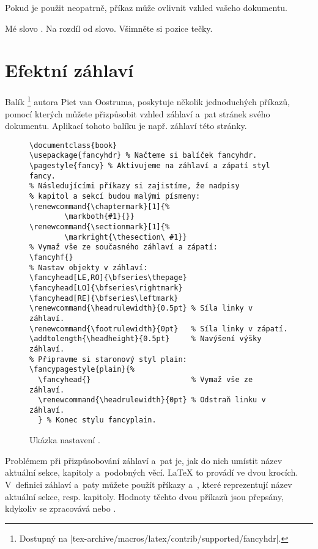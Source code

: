 Pokud je použit neopatrně, příkaz  může ovlivnit vzhled vašeho dokumentu.

\begin{example}
Mé slovo . Na rozdíl
od slovo. Všimněte
si pozice tečky.
\end{example}

\section{Efektní záhlaví}
\label{sec:fancy}

Balík \footnote{Dostupný na
  \CTANalt|tex-archive/macros/latex/contrib/supported/fancyhdr|.} autora
Piet van Oostruma, poskytuje několik jednoduchých příkazů, pomocí
kterých můžete přizpůsobit vzhled záhlaví a~pat stránek svého
dokumentu. Aplikací tohoto balíku je např. záhlaví této stránky.


\begin{figure}[!htbp]
\begin{lined}{\textwidth}
\begin{verbatim}
\documentclass{book}
\usepackage{fancyhdr} % Načteme si balíček fancyhdr.
\pagestyle{fancy} % Aktivujeme na záhlaví a zápatí styl fancy.
% Následujícími příkazy si zajistíme, že nadpisy  
% kapitol a sekcí budou malými písmeny:
\renewcommand{\chaptermark}[1]{%
        \markboth{#1}{}}
\renewcommand{\sectionmark}[1]{%
        \markright{\thesection\ #1}}
% Vymaž vše ze současného záhlaví a zápatí:
\fancyhf{} 
% Nastav objekty v záhlaví:
\fancyhead[LE,RO]{\bfseries\thepage}
\fancyhead[LO]{\bfseries\rightmark}
\fancyhead[RE]{\bfseries\leftmark}
\renewcommand{\headrulewidth}{0.5pt} % Síla linky v záhlaví.
\renewcommand{\footrulewidth}{0pt}   % Síla linky v zápatí.
\addtolength{\headheight}{0.5pt}     % Navýšení výšky záhlaví.
% Připravme si staronový styl plain:
\fancypagestyle{plain}{%
  \fancyhead{}                       % Vymaž vše ze záhlaví.
  \renewcommand{\headrulewidth}{0pt} % Odstraň linku v záhlaví.
  } % Konec stylu fancyplain.
\end{verbatim}
\end{lined}
\caption{Ukázka nastavení .} \label{fancyhdr}
\end{figure}

Problémem při přizpůsobování záhlaví a~pat je, jak do nich umístit
název aktuální sekce, kapitoly a~podobných věcí. \LaTeX{} to provádí
ve dvou krocích. V~definici záhlaví a~paty můžete použít příkazy
 a~, které reprezentují název aktuální
sekce, resp. kapitoly. Hodnoty těchto dvou příkazů jsou přepsány,
kdykoliv se zpracovává  nebo .

